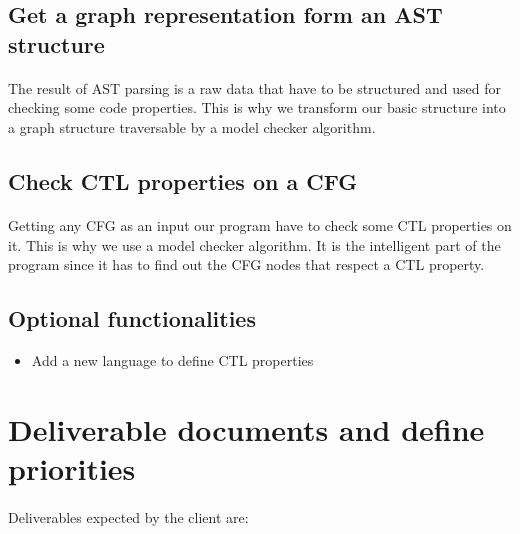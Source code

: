 \documentclass{report}
\begin{document}
\subsection{Get a graph representation form an AST structure}

\paragraph{}
\hspace{4mm}\textnormal{The result of AST parsing is a raw data that have to be structured and used for checking some code properties. This is why we transform our basic structure into a graph structure traversable by a model checker algorithm.}

\subsection{Check CTL properties on a CFG}

\paragraph{}
\hspace{4mm}\textnormal{Getting any CFG as an input our program have to check some CTL properties on it. This is why we use a model checker algorithm. It is the intelligent part of the program since it has to find out the CFG nodes that respect a CTL property.}

\subsection{Optional functionalities}

\vspace{4mm}
\begin{itemize}
\item Add a new language to define CTL properties\vspace{1mm}
\end{itemize}

\section{Deliverable documents and define priorities}

\paragraph{}
\hspace{4mm}\textnormal{Deliverables expected by the client are:}
\end{document}
